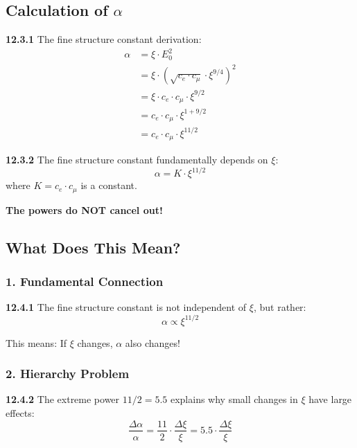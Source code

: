 \documentclass[12pt,a4paper]{article}
\begin{document}
\subsection{Calculation of $\alpha$}

\noindent \textbf{12.3.1} The fine structure constant derivation:
\begin{align}
	\alpha &= \xi \cdot E_0^2 \\
	&= \xi \cdot (\sqrt{c_e \cdot c_\mu} \cdot \xi^{9/4})^2 \\
	&= \xi \cdot c_e \cdot c_\mu \cdot \xi^{9/2} \\
	&= c_e \cdot c_\mu \cdot \xi^{1 + 9/2} \\
	&= c_e \cdot c_\mu \cdot \xi^{11/2}
\end{align}

\begin{tcolorbox}[colback=red!5!white,colframe=red!75!black,title=\textbf{IMPORTANT RESULT}]
	\noindent \textbf{12.3.2} The fine structure constant fundamentally depends on $\xi$:
	\begin{equation}
		\boxed{\alpha = K \cdot \xi^{11/2}}
	\end{equation}
	where $K = c_e \cdot c_\mu$ is a constant.
	
	\textbf{The powers do NOT cancel out!}
\end{tcolorbox}

\subsection{What Does This Mean?}

\subsubsection{1. Fundamental Connection}
\noindent \textbf{12.4.1} The fine structure constant is not independent of $\xi$, but rather:
\begin{equation}
	\alpha \propto \xi^{11/2}
\end{equation}

This means: If $\xi$ changes, $\alpha$ also changes!

\subsubsection{2. Hierarchy Problem}
\noindent \textbf{12.4.2} The extreme power $11/2 = 5.5$ explains why small changes in $\xi$ have large effects:
\begin{equation}
	\frac{\Delta \alpha}{\alpha} = \frac{11}{2} \cdot \frac{\Delta \xi}{\xi} = 5.5 \cdot \frac{\Delta \xi}{\xi}
\end{equation}
\end{document}
